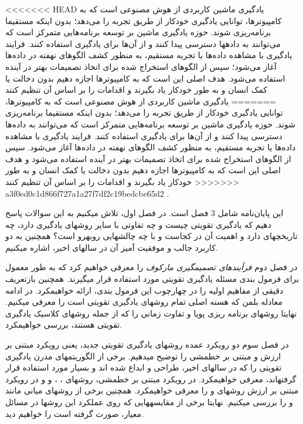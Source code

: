 
<<<<<<< HEAD
یادگیری ماشین کاربردی از هوش مصنوعی
است که به کامپیوترها، توانایی یادگیری خودکار از طریق تجربه  را می‌دهد؛ بدون اینکه مستقیما برنامه‌ریزی شوند. حوزه یادگیری ماشین بر توسعه برنامه‌هایی متمرکز است که می‌توانند به داده\nf ها دسترسی پیدا کنند و از آن‌ها برای یادگیری استفاده کنند. فرایند یادگیری با مشاهده داده‌ها یا تجربه مستقیم،  به منظور کشف الگوهای نهفته در داده‌ها آغاز می‌شود؛  سپس از الگوهای  استخراج شده برای اتخاذ تصمیمات بهتر در آینده استفاده می‌شود. هدف اصلی این است که به کامپیوترها اجازه دهیم بدون دخالت یا کمک انسان و به طور خودکار یاد بگیرند و اقدامات را بر اساس آن تنظیم کنند
=======
یادگیری ماشین کاربردی از هوش مصنوعی 
است که به کامپیوترها، توانایی یادگیری خودکار از طریق تجربه  را می‌دهد؛ بدون اینکه مستقیما برنامه‌ریزی شوند. حوزه یادگیری ماشین بر توسعه برنامه‌هایی متمرکز است که می‌توانند به داده‌ها دسترسی پیدا کنند و از آن‌ها برای یادگیری استفاده کنند. فرایند یادگیری با مشاهده داده‌ها یا تجربه مستقیم،  به منظور کشف الگوهای نهفته در داده‌ها آغاز می‌شود.  سپس از الگوهای  استخراج شده برای اتخاذ تصمیمات بهتر در آینده استفاده می‌شود و هدف اصلی این است که به کامپیوترها اجازه دهیم بدون دخالت یا کمک انسان و به طور خودکار یاد بگیرند و اقدامات را بر اساس آن تنظیم کنند
>>>>>>> a3f0ed0c1d866f727a1a27f7df2c19bedcbe65d2
\cite{mldef}.


این پایان‌نامه شامل 3 فصل است. در فصل اول، تلاش می\nf کنیم به این سوالات پاسخ دهیم که یادگیری تقویتی چیست و چه تفاوتی با سایر روش\nf های یادگیری دارد، چه تاریخچه\nf ای دارد و اهمیت آن در کجاست و با چه چالش\nf هایی روبه\nf رو است؟ همچنین به دو کاربرد جالب و موفقیت آمیز آن در سال\nf های اخیر، اشاره می\nf کنیم.

در فصل دوم \textit{فرآیندهای تصمیم\nf گیری مارکوف} را معرفی خواهیم کرد که به طور معمول برای  فرمول بندی مسئله یادگیری تقویتی مورد استفاده قرار می\nf گیرند. همچنین بازتعریف دقیقی از مفاهیم اولیه را در چهارچوب این فرمول بندی، ارائه خواهیم\nf کرد. در ادامه معادله بلمن که هسته اصلی تمام روش\nf های یادگیری تقویتی است را معرفی می\nf کنیم. نهایتا روش\nf های برنامه ریزی پویا و تفاوت زمانی  را که از جمله روش\nf های کلاسیک یادگیری تقویتی هستند، بررسی خواهیم\nf کرد.

در فصل سوم دو رویکرد عمده روش\nf های یادگیری تقویتی جدید، یعنی رویکرد مبتنی بر ارزش و مبتنی بر خط\nf مشی را توضیح می\nf دهیم. برخی از الگوریتم\nf های مدرن یادگیری تقویتی  را که در سال\nf های اخیر، طراحی و ابداع شده اند و بسیار مورد استفاده قرار گرفته\nf اند، معرفی خواهیم\nf کرد. در رویکرد مبتنی بر خط\nf مشی، روش\nf های
،
،
و
و در رویکرد مبتنی بر ارزش روش\nf های
و
را معرفی خواهیم\nf کرد. همچنین برخی از روش\nf های میانی مانند
و
را بررسی می\nf کنیم. نهایتا برخی از مقایسه\nf هایی که روی  عملکرد این روش\nf ها در مسائل معیار، صورت گرفته است را خواهیم دید.

